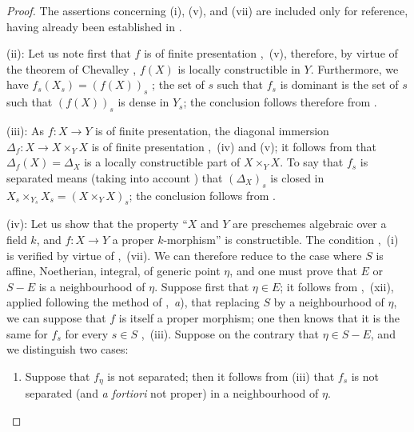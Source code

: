\begin{proof}
The assertions concerning (i), (v), and (vii) are included only for reference, having already been established in .

(ii): Let us note first that $f$ is of finite presentation ,~(v), therefore, by virtue of the theorem of Chevalley , $f(X)$ is locally constructible in $Y$.
Furthermore, we have $f_s(X_s)=(f(X))_s$ ; the set of $s$ such that $f_s$ is dominant is the set of $s$ such that $(f(X))_s$ is dense in $Y_s$; the conclusion follows therefore from .

(iii): As $f:X\to Y$ is of finite presentation, the diagonal immersion $\Delta_f:X\to X\times_Y X$ is of finite presentation ,~(iv) and (v); it follows from  that $\Delta_f(X)=\Delta_X$ is a locally constructible part of $X\times_Y X$.
To say that $f_s$ is separated means (taking into account ) that $(\Delta_X)_s$ is closed in $X_s\times_{Y_s} X_s=(X\times_Y X)_s$; the conclusion follows from .


(iv): Let us show that the property ``$X$ and $Y$ are preschemes algebraic over a field $k$, and $f:X\to Y$ a proper $k$-morphism'' is constructible.
The condition ,~(i) is verified by virtue of ,~(vii).
We can therefore reduce to the case where $S$ is affine, Noetherian, integral, of generic point $\eta$, and one must prove that $E$ or $S-E$ is a neighbourhood of $\eta$.
Suppose first that $\eta\in E$; it follows from ,~(xii), applied following the method of ,~\emph{a}), that replacing $S$ by a neighbourhood of $\eta$, we can
suppose that $f$ is itself a proper morphism; one then knows that it is the same for $f_s$ for every $s\in S$ ,~(iii).
Suppose on the contrary that $\eta\in S-E$, and we distinguish two cases:
\begin{enumerate}[label=\upshape{$\arabic{enumi}^\circ$}]
  \item Suppose that $f_\eta$ is not separated; then it follows from (iii) that $f_s$ is not separated (and \emph{a fortiori} not proper) in a neighbourhood of $\eta$.


\end{enumerate}
\end{proof}
